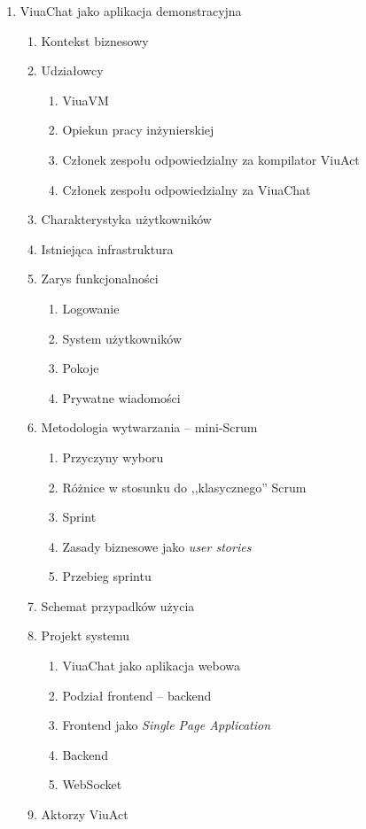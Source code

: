 \documentclass[11pt,oneside,a4paper,twocolumn]{article}
\begin{document}
\begin{enumerate}
\item ViuaChat jako aplikacja demonstracyjna
\begin{enumerate}
	\item Kontekst biznesowy 
	\item Udziałowcy
	\begin{enumerate}
		\item ViuaVM
		\item Opiekun pracy inżynierskiej
		\item Członek zespołu odpowiedzialny za kompilator ViuAct
		\item Członek zespołu odpowiedzialny za ViuaChat
	\end{enumerate}
	\item Charakterystyka użytkowników
	\item Istniejąca infrastruktura
	\item Zarys funkcjonalności
	\begin{enumerate}
		\item Logowanie
		\item System użytkowników
		\item Pokoje
		\item Prywatne wiadomości
	\end{enumerate}
	\item Metodologia wytwarzania -- mini-Scrum
	\begin{enumerate}
		\item Przyczyny wyboru
		\item Różnice w stosunku do ,,klasycznego'' Scrum
		\item Sprint
		\item Zasady biznesowe jako \textit{user stories}
		\item Przebieg sprintu
	\end{enumerate}
	\item Schemat przypadków użycia
	\item Projekt systemu
	\begin{enumerate}
		\item ViuaChat jako aplikacja webowa
		\item Podział frontend -- backend
		\item Frontend jako \textit{Single Page Application}
		\item Backend
		\item WebSocket
	\end{enumerate}

	\item Aktorzy ViuAct
	\begin{enumerate}
		

\end{enumerate}
\end{enumerate}
\end{enumerate}
\end{document}
